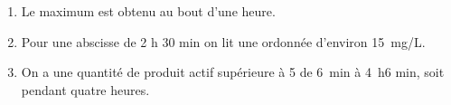
\medskip

% 
%
% 
% 

\medskip
\begin{enumerate}
\item %
Le maximum est obtenu au bout d'une heure. 
\item %
Pour une abscisse de 2 h 30 min on lit une ordonnée d'environ 15~mg/L. 
\item %
 
On a une quantité de produit actif supérieure à 5 de 6~min à 4~h6 min, soit pendant  quatre heures.
\end{enumerate}

\bigskip 

